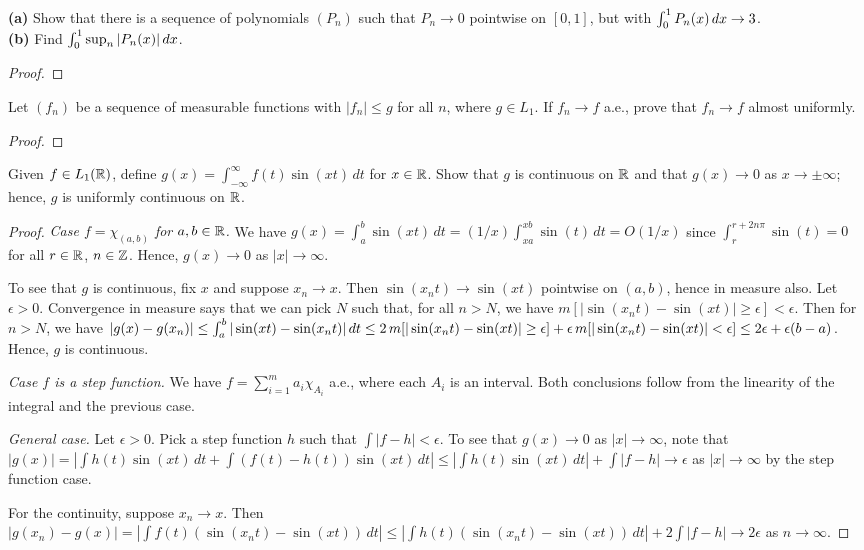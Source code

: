 \documentclass{article}
\begin{document}
 \textbf{(a)} Show that there is a sequence of polynomials $(P_n)$ such that $P_n \to 0$ pointwise on $[0,1]$, but with $\int_0^1 P_n(x)\,dx \to 3$. \\
\textbf{(b)} Find $\int_0^1 \sup_n |P_n(x)|\,dx$.
\begin{proof}
\end{proof}
 Let $(f_n)$ be a sequence of measurable functions with $|f_n| \le g$ for all $n$, where $g\in L_1$. If $f_n \to f$ a.e., prove that $f_n \to f$ almost uniformly.
\begin{proof}
\end{proof}
 Given $f\in L_1(\mathbb{R})$, define $g(x) = \int_{-\infty}^\infty f(t) \sin(xt) \,dt$ for $x\in\mathbb{R}$. Show that $g$ is continuous on $\mathbb{R}$ and that $g(x) \to 0$ as $x \to \pm \infty$; hence, $g$ is uniformly continuous on $\mathbb{R}$.
\begin{proof}

\emph{Case $f = \chi_{(a,b)}$ for $a,b \in \mathbb{R}$.} We have $g(x) = \int_a^b \sin(xt) \,dt = (1/x) \int_{xa}^{xb} \sin(t) \, dt = O(1/x)$ since $\int_r^{r+2n\pi} \sin(t) = 0$ for  all $r \in \mathbb{R}$, $n \in \mathbb{Z}$. Hence, $g(x) \to 0$ as $|x| \to \infty$.  

To see that $g$ is continuous, fix $x$ and suppose $x_n \to x$.  Then $\sin(x_nt) \to\sin(xt)$ pointwise on $(a,b)$, hence in measure also.  Let $\epsilon > 0$. Convergence in measure says that we can pick $N$ such that, for all $n > N$, we have $m[|\sin(x_nt) - \sin(xt)| \ge \epsilon] < \epsilon$.  Then for $n > N$, we have $|g(x) - g(x_n)| \le \int_a^b |\sin(xt) - \sin(x_nt)| \,dt 
\le 2 \,m[|\sin(x_nt) - \sin(xt)| \ge \epsilon] + \epsilon \,m[|\sin(x_nt) - \sin(xt)| < \epsilon] \le 2\epsilon + \epsilon(b-a)$. Hence, $g$ is continuous.

\emph{Case $f$ is a step function.} We have $f = \sum_{i=1}^m a_i \chi_{A_i}$ a.e., where each $A_i$ is an interval. Both conclusions follow from the linearity of the integral and the previous case.

\emph{General case.} Let $\epsilon > 0$. Pick a step function $h$ such that $\int|f-h| < \epsilon$. To see that $g(x) \to 0$ as $|x| \to \infty$, note that
$|g(x)| = |\int h(t) \sin(xt) \,dt + \int (f(t) - h(t)) \sin(xt) \,dt| \le |\int h(t) \sin(xt) \,dt| + \int |f - h| \to \epsilon$ as $|x| \to \infty$ by the step function case. 

For the continuity, suppose $x_n\to x$. Then $|g(x_n) - g(x)| = |\int f(t) (\sin(x_nt) - \sin(xt)) \,dt| \le  |\int h(t) (\sin(x_nt) - \sin(xt)) \,dt| + 2 \int |f - h|
\to 2\epsilon$ as $n \to \infty$.
\end{proof}
\end{document}
